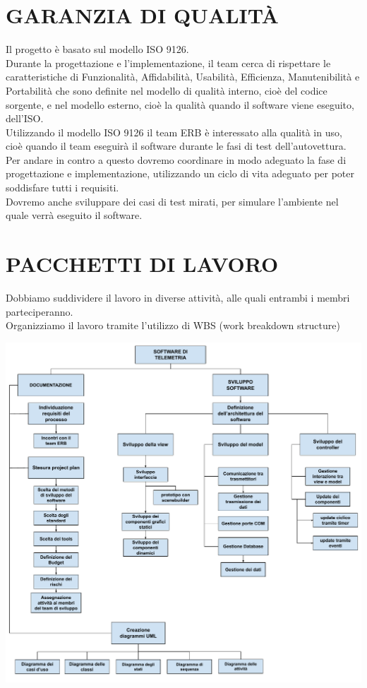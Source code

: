 \documentclass{report}
\begin{document}
\chapter{GARANZIA DI QUALITÀ}
Il progetto è basato sul modello ISO 9126.\\
Durante la progettazione e l'implementazione, il team cerca di rispettare le caratteristiche di Funzionalità, Affidabilità, Usabilità, Efficienza, Manutenibilità e Portabilità che sono definite nel modello di qualità interno, cioè del codice sorgente, e nel modello esterno, cioè la qualità quando il software viene eseguito, dell'ISO.\\
Utilizzando il modello ISO 9126 il team ERB è interessato alla qualità in uso, cioè quando il team eseguirà il software durante le fasi di test dell'autovettura.\\
Per andare in contro a questo dovremo coordinare in modo adeguato la fase di progettazione e implementazione, utilizzando un ciclo di vita adeguato per poter soddisfare tutti i requisiti.\\
Dovremo anche sviluppare dei casi di test mirati, per simulare l'ambiente nel quale verrà eseguito il software.


\chapter{PACCHETTI DI LAVORO}
Dobbiamo suddividere il lavoro in diverse attività, alle quali entrambi i membri parteciperanno.\\
Organizziamo il lavoro tramite l'utilizzo di WBS (work breakdown structure)
\begin{center}
\includegraphics[scale=0.6]{Disegno senza titolo (2).pdf} 
\end{center}
\end{document}
